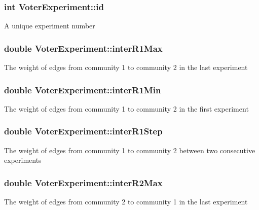\subsubsection[{id}]{\setlength{\rightskip}{0pt plus 5cm}int Voter\+Experiment\+::id}\label{class_voter_experiment_a013f931e0562435c97530c8a4be7042e}
A unique experiment number \hypertarget{class_voter_experiment_a9bdf90b5a8c519608bb14337b7b6a884}{}
\subsubsection[{inter\+R1\+Max}]{\setlength{\rightskip}{0pt plus 5cm}double Voter\+Experiment\+::inter\+R1\+Max}\label{class_voter_experiment_a9bdf90b5a8c519608bb14337b7b6a884}
The weight of edges from community 1 to community 2 in the last experiment \hypertarget{class_voter_experiment_a46f2fcbd4356bf8d89de85048ee086fb}{}
\subsubsection[{inter\+R1\+Min}]{\setlength{\rightskip}{0pt plus 5cm}double Voter\+Experiment\+::inter\+R1\+Min}\label{class_voter_experiment_a46f2fcbd4356bf8d89de85048ee086fb}
The weight of edges from community 1 to community 2 in the first experiment \hypertarget{class_voter_experiment_ab720cd6c457bc899a795c95a95922b54}{}
\subsubsection[{inter\+R1\+Step}]{\setlength{\rightskip}{0pt plus 5cm}double Voter\+Experiment\+::inter\+R1\+Step}\label{class_voter_experiment_ab720cd6c457bc899a795c95a95922b54}
The weight of edges from community 1 to community 2 between two consecutive experiments \hypertarget{class_voter_experiment_a50fba0900d0a667baa81860789104b08}{}
\subsubsection[{inter\+R2\+Max}]{\setlength{\rightskip}{0pt plus 5cm}double Voter\+Experiment\+::inter\+R2\+Max}\label{class_voter_experiment_a50fba0900d0a667baa81860789104b08}
The weight of edges from community 2 to community 1 in the last experiment \hypertarget{class_voter_experiment_a8ddf85950b96c4b19081b77e61e5cb74}{}
